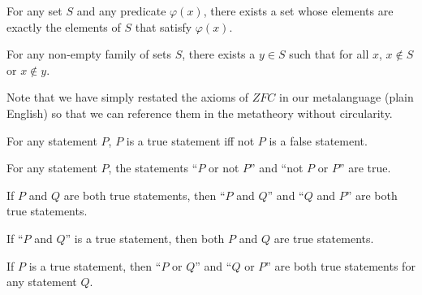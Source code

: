 \begin{meta-axiom}
     \label{meta-axiom:specification}
    For any set \( S \) and any predicate \( \varphi(x) \), there exists a set whose elements are exactly the elements of \( S \) that satisfy \( \varphi(x) \).
\end{meta-axiom}

\begin{meta-axiom}
     \label{meta-axiom:regularity}
    For any non-empty family of sets \( S \), there exists a \( y \in S \) such that for all \( x \), \( x \notin S \) or \( x \notin y \).
\end{meta-axiom}

\begin{rem}
    Note that we have simply restated the axioms of \( ZFC \) in our metalanguage (plain English) so that we can reference them in the metatheory without circularity.
\end{rem}

\begin{meta-rule}
     \label{meta-rule:law-of-non-contradiction}
    For any statement \( P \), \( P \) is a true statement iff not \( P \) is a false statement.
\end{meta-rule}

\begin{meta-rule}
     \label{meta-rule:law-of-excluded-middle}
    For any statement \( P \), the statements ``\( P \) or not \( P \)'' and ``not \( P \) or \( P \)'' are true.
\end{meta-rule}

\begin{meta-rule}
     \label{meta-rule:conjunction-introduction}
    If \( P \) and \( Q \) are both true statements, then ``\( P \) and \( Q \)'' and ``\( Q \) and \( P \)'' are both true statements.
\end{meta-rule}

\begin{meta-rule}
     \label{meta-rule:conjunction-elimination}
    If ``\( P \) and \( Q \)'' is a true statement, then both \( P \) and \( Q \) are true statements.
\end{meta-rule}

\begin{meta-rule}
     \label{meta-rule:disjunction-introduction}
    If \( P \) is a true statement, then ``\( P \) or \( Q \)'' and ``\( Q \) or \( P \)'' are both true statements for any statement \( Q \).
\end{meta-rule}


